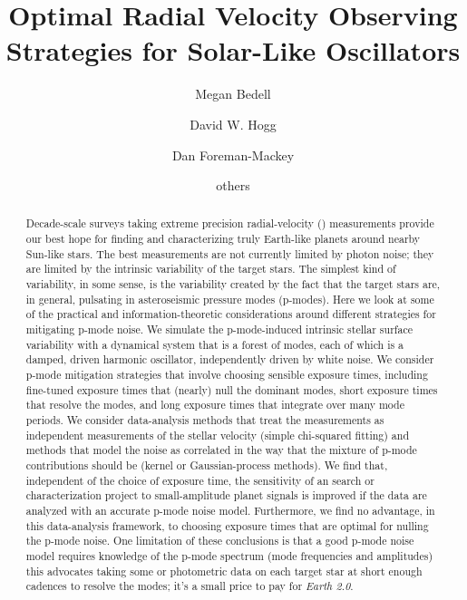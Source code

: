\documentclass[modern]{aastex62}
\begin{document}
\sloppy\sloppypar\raggedbottom\frenchspacing %

\graphicspath{ {figures/} }

\title{Optimal Radial Velocity Observing Strategies for Solar-Like Oscillators}


\author[0000-0001-9907-7742]{Megan Bedell}
\affiliation{\flatiron}


\author[0000-0003-2866-9403]{David W. Hogg}
\affiliation{\flatiron}
\affiliation{\nyuccpp}
\affiliation{\nyucds}
\affiliation{\mpia}

\author[0000-0002-9328-5652]{Dan Foreman-Mackey}
\affiliation{\flatiron}

\author{others}


\begin{abstract}\noindent
Decade-scale surveys taking extreme precision radial-velocity (\EPRV)
measurements provide our best hope for finding and characterizing
truly Earth-like planets around nearby Sun-like stars.
The best \EPRV measurements are not currently limited by photon noise;
they are limited by the intrinsic variability of the target stars.
The simplest kind of variability, in some sense, is the variability
created by the fact that the target stars are, in general, pulsating
in asteroseismic pressure modes (p-modes).
Here we look at some of the practical and information-theoretic
considerations around different strategies for mitigating p-mode
noise.
We simulate the p-mode-induced intrinsic stellar surface variability
with a dynamical system that is a forest of modes, each of which is a
damped, driven harmonic oscillator, independently driven by white noise.
We consider p-mode mitigation strategies that involve choosing
sensible exposure times, including fine-tuned exposure times that
(nearly) null the dominant modes, short exposure times that resolve
the modes, and long exposure times that integrate over many mode
periods.
We consider data-analysis methods that treat the measurements as
independent measurements of the stellar velocity (simple chi-squared
fitting) and methods that model the noise as correlated in the way
that the mixture of p-mode contributions should be (kernel or
Gaussian-process methods).
We find that, independent of the choice of exposure time, the
sensitivity of an \EPRV search or characterization project to
small-amplitude planet signals is improved if the data are analyzed
with an accurate p-mode noise model.
Furthermore, we find no advantage, in this data-analysis framework, to
choosing exposure times that are optimal for nulling the p-mode noise.
One limitation of these conclusions is that a good p-mode noise model
requires knowledge of the p-mode spectrum (mode frequencies and
amplitudes) this advocates taking some \EPRV or photometric data on
each target star at short enough cadences to resolve the modes; it's
a small price to pay for \emph{Earth 2.0}.
\end{abstract}
\end{document}
